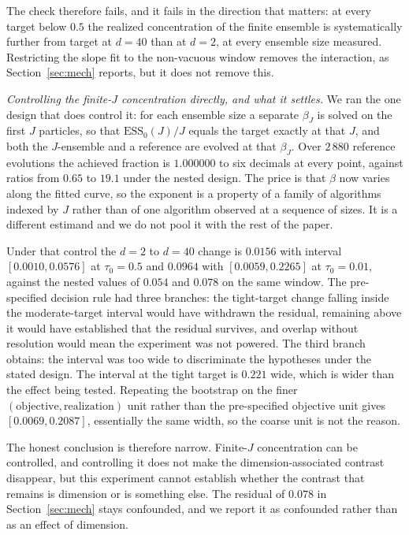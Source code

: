 \documentclass[pdflatex,sn-mathphys-num]{sn-jnl}
\theoremstyle{thmstyleone}
\theoremstyle{thmstyletwo}
\theoremstyle{thmstylethree}
\begin{document}
The check therefore fails, and it fails in the direction that matters: at every target below $0.5$ the realized concentration of the finite ensemble is systematically further from target at $d=40$ than at $d=2$, at every ensemble size measured. Restricting the slope fit to the non-vacuous window removes the interaction, as Section~\ref{sec:mech} reports, but it does not remove this.

\emph{Controlling the finite-$J$ concentration directly, and what it settles.} We ran the one design that does control it: for each ensemble size a separate $\beta_J$ is solved on the first $J$ particles, so that $\mathrm{ESS}_0(J)/J$ equals the target exactly at that $J$, and both the $J$-ensemble and a reference are evolved at that $\beta_J$. Over $2\,880$ reference evolutions the achieved fraction is $1.000000$ to six decimals at every point, against ratios from $0.65$ to $19.1$ under the nested design. The price is that $\beta$ now varies along the fitted curve, so the exponent is a property of a family of algorithms indexed by $J$ rather than of one algorithm observed at a sequence of sizes. It is a different estimand and we do not pool it with the rest of the paper.

Under that control the $d=2$ to $d=40$ change is $0.0156$ with interval $[0.0010,0.0576]$ at $\tau_0=0.5$ and $0.0964$ with $[0.0059,0.2265]$ at $\tau_0=0.01$, against the nested values of $0.054$ and $0.078$ on the same window. The pre-specified decision rule had three branches: the tight-target change falling inside the moderate-target interval would have withdrawn the residual, remaining above it would have established that the residual survives, and overlap without resolution would mean the experiment was not powered. The third branch obtains: the interval was too wide to discriminate the hypotheses under the stated design. The interval at the tight target is $0.221$ wide, which is wider than the effect being tested. Repeating the bootstrap on the finer $(\text{objective},\text{realization})$ unit rather than the pre-specified objective unit gives $[0.0069,0.2087]$, essentially the same width, so the coarse unit is not the reason.

The honest conclusion is therefore narrow. Finite-$J$ concentration can be controlled, and controlling it does not make the dimension-associated contrast disappear, but this experiment cannot establish whether the contrast that remains is dimension or is something else. The residual of $0.078$ in Section~\ref{sec:mech} stays confounded, and we report it as confounded rather than as an effect of dimension.
\end{document}
